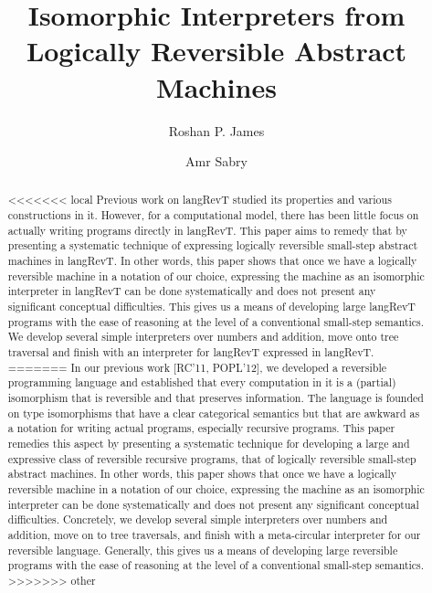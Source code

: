 \documentclass{llncs}
\begin{document}
\title{Isomorphic Interpreters from Logically Reversible Abstract Machines} 
\author{Roshan P. James \and Amr Sabry}
\maketitle

\begin{abstract}
<<<<<<< local
Previous work on {{langRevT}} \cite{rc2011,infeffects} studied its
properties and various constructions in it. However, for a
computational model, there has been little focus on actually writing
programs directly in {{langRevT}}. This paper aims to remedy that by
presenting a systematic technique of expressing logically reversible
small-step abstract machines in {{langRevT}}. In other words, this
paper shows that once we have a logically reversible machine in a
notation of our choice, expressing the machine as an isomorphic
interpreter in {{langRevT}} can be done systematically and does not
present any significant conceptual difficulties. This gives us a means
of developing large {{langRevT}} programs with the ease of reasoning
at the level of a conventional small-step semantics.  We develop
several simple interpreters over numbers and addition, move onto tree
traversal and finish with an interpreter for {{langRevT}} expressed in
{{langRevT}}.
=======
  In our previous work [RC'11, POPL'12], we developed a reversible
  programming language and established that every computation in it is a
  (partial) isomorphism that is reversible and that preserves
  information. The language is founded on type isomorphisms that have a clear
  categorical semantics but that are awkward as a notation for writing actual
  programs, especially recursive programs. This paper remedies this aspect by
  presenting a systematic technique for developing a large and expressive
  class of reversible recursive programs, that of logically reversible
  small-step abstract machines. In other words, this paper shows that once we
  have a logically reversible machine in a notation of our choice, expressing
  the machine as an isomorphic interpreter can be done systematically and
  does not present any significant conceptual difficulties. Concretely, we
  develop several simple interpreters over numbers and addition, move on to
  tree traversals, and finish with a meta-circular interpreter for our
  reversible language. Generally, this gives us a means of developing large
  reversible programs with the ease of reasoning at the level of a
  conventional small-step semantics.
>>>>>>> other
\end{abstract}
\end{document}
